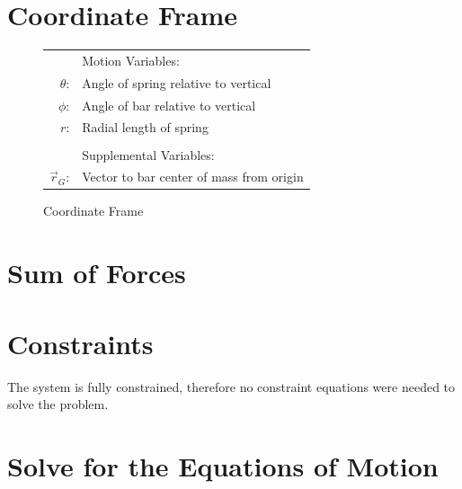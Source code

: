 \documentclass[12pt]{report}
\begin{document}
\begin{flushleft}
\section{Coordinate Frame} \label{section:coord}
\begin{figure}[!htp]
    \begin{minipage}[c]{.4\textwidth}
      \center
      
      \caption{Coordinate Frame}
      \label{coord}
      \vspace{2ex}
    \end{minipage}%
    \begin{minipage}[c]{.6\textwidth}
      \center
      \begin{tabular}{rl}
      & \quad Motion Variables: \\
      $\theta$:& Angle of spring relative to vertical\\
      $\phi$:& Angle of bar relative to vertical\\
      $r$:& Radial length of spring \\
      \\
      & \quad Supplemental Variables: \\
      $\vec{r}_G$:& Vector to bar center of mass from origin \\
    \end{tabular}
    \end{minipage}
\end{figure}
\section{Sum of Forces}

\section{Constraints}
The system is fully constrained, therefore no constraint equations were needed to
solve the problem.
\section{Solve for the Equations of Motion}

\end{flushleft}
\end{document}
